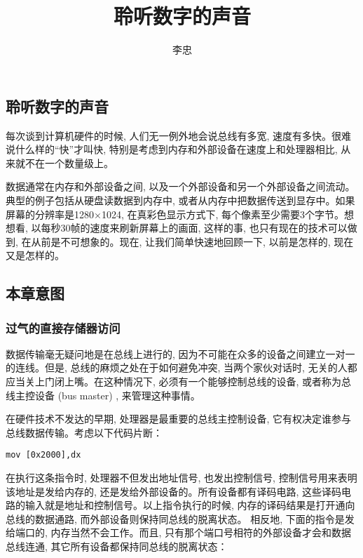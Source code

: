 \documentclass[12pt]{article}
\begin{document}
\begin{CJK}{UTF8}{gbsn} %


\title{聆听数字的声音}
\author{李忠}

\maketitle

\newpage
\tableofcontents
\newpage

\addtocounter{section}{9}
\section{聆听数字的声音}
每次谈到计算机硬件的时候, 人们无一例外地会说总线有多宽, 速度有多快。很难说什么样的“快”才叫快, 特别是考虑到内存和外部设备在速度上和处理器相比, 从来就不在一个数量级上。

数据通常在内存和外部设备之间, 以及一个外部设备和另一个外部设备之间流动。典型的例子包括从硬盘读数据到内存中, 或者从内存中把数据传送到显存中。如果屏幕的分辨率是1280×1024, 在真彩色显示方式下, 每个像素至少需要3个字节。想想看, 以每秒30帧的速度来刷新屏幕上的画面, 这样的事, 也只有现在的技术可以做到, 在从前是不可想象的。现在, 让我们简单快速地回顾一下, 以前是怎样的, 现在又是怎样的。

\subsection{本章意图}
\subsubsection{过气的直接存储器访问}
数据传输毫无疑问地是在总线上进行的, 因为不可能在众多的设备之间建立一对一的连线。但是, 总线的麻烦之处在于如何避免冲突, 当两个家伙对话时, 无关的人都应当关上门闭上嘴。在这种情况下, 必须有一个能够控制总线的设备, 或者称为总线主控设备 (bus master) , 来管理这种事情。

在硬件技术不发达的早期, 处理器是最重要的总线主控制设备, 它有权决定谁参与总线数据传输。考虑以下代码片断：

\begin{verbatim}
mov [0x2000],dx
\end{verbatim}

在执行这条指令时, 处理器不但发出地址信号, 也发出控制信号, 控制信号用来表明该地址是发给内存的, 还是发给外部设备的。所有设备都有译码电路, 这些译码电路的输入就是地址和控制信号。以上指令执行的时候, 内存的译码结果是打开通向总线的数据通路, 而外部设备则保持同总线的脱离状态。
相反地, 下面的指令是发给端口的, 内存当然不会工作。而且, 只有那个端口号相符的外部设备才会和数据总线连通, 其它所有设备都保持同总线的脱离状态：


\end{CJK}
\end{document}
